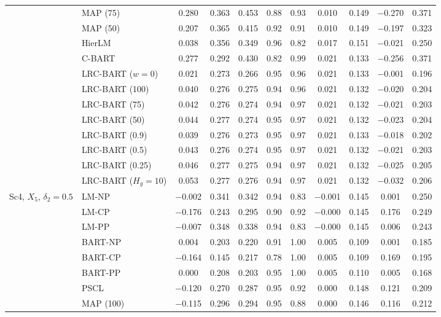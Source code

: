 \documentclass[11pt]{article}
\theoremstyle{definition}
\theoremstyle{plain}
\begin{document}
\begin{center}
\begin{longtable}{llccccccccc}
& MAP (75) & 0.280 & 0.363 & 0.453 & 0.88 & 0.93 & 0.010 & 0.149 & $-$0.270 & 0.371 \\
& MAP (50) & 0.207 & 0.365 & 0.415 & 0.92 & 0.91 & 0.010 & 0.149 & $-$0.197 & 0.323 \\
& HierLM & 0.038 & 0.356 & 0.349 & 0.96 & 0.82 & 0.017 & 0.151 & $-$0.021 & 0.250 \\
& C-BART & 0.277 & 0.292 & 0.430 & 0.82 & 0.99 & 0.021 & 0.133 & $-$0.256 & 0.371 \\
& LRC-BART ($w=0$) & 0.021 & 0.273 & 0.266 & 0.95 & 0.96 & 0.021 & 0.133 & $-$0.001 & 0.196 \\
& LRC-BART (100) & 0.040 & 0.276 & 0.275 & 0.94 & 0.96 & 0.021 & 0.132 & $-$0.020 & 0.204 \\
& LRC-BART (75) & 0.042 & 0.276 & 0.274 & 0.94 & 0.97 & 0.021 & 0.132 & $-$0.021 & 0.203 \\
& LRC-BART (50) & 0.044 & 0.277 & 0.274 & 0.95 & 0.97 & 0.021 & 0.132 & $-$0.023 & 0.204 \\
& LRC-BART (0.9) & 0.039 & 0.276 & 0.273 & 0.95 & 0.97 & 0.021 & 0.133 & $-$0.018 & 0.202 \\
& LRC-BART (0.5) & 0.043 & 0.276 & 0.274 & 0.95 & 0.97 & 0.021 & 0.132 & $-$0.021 & 0.203 \\
& LRC-BART (0.25) & 0.046 & 0.277 & 0.275 & 0.94 & 0.97 & 0.021 & 0.132 & $-$0.025 & 0.205 \\
& LRC-BART ($H_g=10$) & 0.053 & 0.277 & 0.276 & 0.94 & 0.97 & 0.021 & 0.132 & $-$0.032 & 0.206 \\
\midrule
\multirow{20}{*}{Sc4, $X_5$, $\delta_2=0.5$} & LM-NP & $-$0.002 & 0.341 & 0.342 & 0.94 & 0.83 & $-$0.001 & 0.145 & 0.001 & 0.250 \\
& LM-CP & $-$0.176 & 0.243 & 0.295 & 0.90 & 0.92 & $-$0.000 & 0.145 & 0.176 & 0.249 \\
& LM-PP & $-$0.007 & 0.348 & 0.338 & 0.94 & 0.83 & $-$0.000 & 0.145 & 0.006 & 0.243 \\
& BART-NP & 0.004 & 0.203 & 0.220 & 0.91 & 1.00 & 0.005 & 0.109 & 0.001 & 0.185 \\
& BART-CP & $-$0.164 & 0.145 & 0.217 & 0.78 & 1.00 & 0.005 & 0.109 & 0.169 & 0.195 \\
& BART-PP & 0.000 & 0.208 & 0.203 & 0.95 & 1.00 & 0.005 & 0.110 & 0.005 & 0.168 \\
& PSCL & $-$0.120 & 0.270 & 0.287 & 0.95 & 0.92 & 0.000 & 0.148 & 0.121 & 0.209 \\
& MAP (100) & $-$0.115 & 0.296 & 0.294 & 0.95 & 0.88 & 0.000 & 0.146 & 0.116 & 0.212 \\

\end{longtable}
\end{center}
\end{document}

